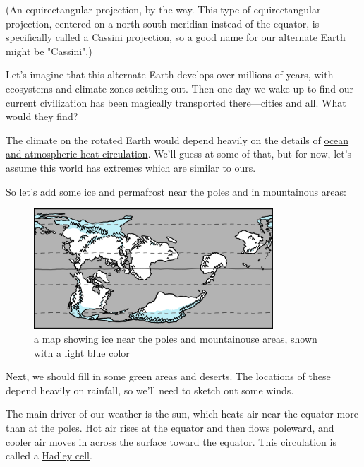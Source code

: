 {(An equirectangular projection, by the way. This type of equirectangular projection, centered on a north-south meridian instead of the equator, is specifically called a Cassini projection, so a good name for our alternate Earth might be "Cassini".)}

{Let’s imagine that this alternate Earth develops over millions of years, with ecosystems and climate zones settling out. Then one day we wake up to find our current civilization has been magically transported there—cities and all. What would they find?}

{The climate on the rotated Earth would depend heavily on the details of \href{http://eesc.columbia.edu/courses/ees/climate/lectures/gen\_circ/index.html}{ocean and atmospheric heat circulation}. We'll guess at some of that, but for now, let's assume this world has extremes which are similar to ours.}

{So let's add some ice and permafrost near the poles and in mountainous areas:}

\begin{figure}[!htbp]
\centering
\includegraphics[scale=0.5, max width=0.8\textwidth]{imgs/a/10/cassini_ice.png}
\caption{a map showing ice near the poles and mountainouse areas, shown with a light blue color}
\end{figure}

{Next, we should fill in some green areas and deserts. The locations of these depend heavily on rainfall, so we’ll need to sketch out some winds.}

{The main driver of our weather is the sun, which heats air near the equator more than at the poles. Hot air rises at the equator and then flows poleward, and cooler air moves in across the surface toward the equator. This circulation is called a \href{http://en.wikipedia.org/wiki/Hadley\_cell}{Hadley cell}.}

